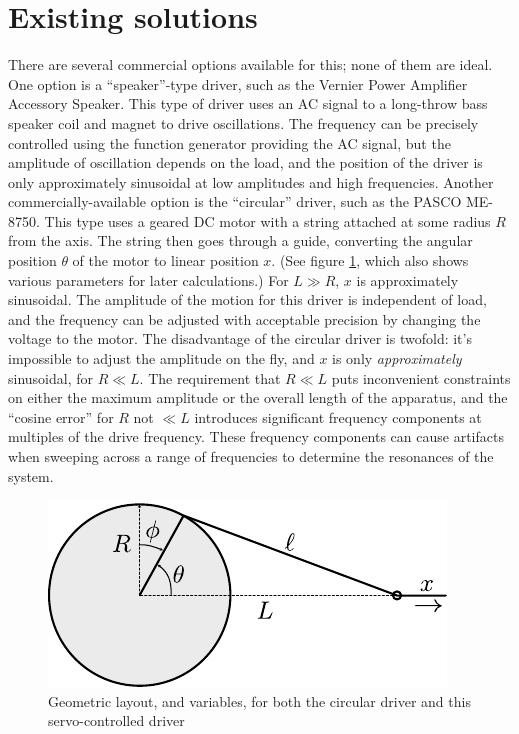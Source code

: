 \documentclass[prb,preprint]{revtex4-1}
\begin{document}
\section{Existing solutions}
There are several commercial options available for this; none of them are ideal. 
One option is a ``speaker''-type driver, such as the Vernier Power Amplifier Accessory Speaker.\cite{VernierSpeaker}  
This type of driver uses an AC signal to a long-throw bass speaker coil and magnet to drive oscillations. 
The frequency can be precisely controlled using the function generator providing the AC signal, but the amplitude of oscillation depends on the load, and the position of the driver is only approximately sinusoidal at low amplitudes and high frequencies.
Another commercially-available option is the ``circular'' driver, such as the PASCO ME-8750.\cite{PascoMotor} 
This type uses a geared DC motor with a string attached at some radius $R$ from the axis. The string then goes through a guide, converting the angular position $\theta$ of the motor to linear position $x$. (See figure \ref{fig:circular}, which also shows various parameters for later calculations.) 
For $L\gg R$, $x$ is approximately sinusoidal. 
The amplitude of the motion for this driver is independent of load, and the frequency can be adjusted with acceptable precision by changing the voltage to the motor.
The disadvantage of the circular driver is twofold: it's impossible to adjust the amplitude on the fly, and $x$ is only \emph{approximately} sinusoidal, for $R \ll L$.
The requirement that $R \ll L$ puts inconvenient constraints on either the maximum amplitude or the overall length of the apparatus, and the ``cosine error'' for $R$ not $\ll L$ introduces significant frequency components at multiples of the drive frequency. 
These frequency components can cause artifacts when sweeping across a range of frequencies to determine the resonances of the system.

\begin{figure}[ht]
	\begin{center}
		\includegraphics{geometry}
	\end{center}
	\caption{Geometric layout, and variables, for both the circular driver and this servo-controlled driver}
	\label{fig:circular}
\end{figure}
\end{document}
